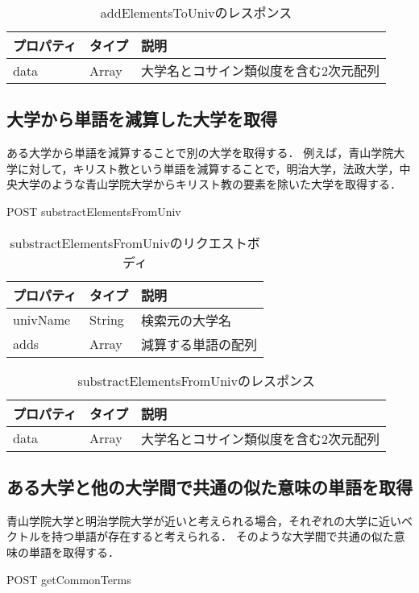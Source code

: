 \begin{table}[htbp]
\caption{addElementsToUnivのレスポンス}
\centering
\begin{tabular}{lll}
\hline
プロパティ & タイプ & 説明
\\ \hline \hline
data & Array & 大学名とコサイン類似度を含む2次元配列\\  \hline
\end{tabular}
\end{table}

\subsection{大学から単語を減算した大学を取得}
ある大学から単語を減算することで別の大学を取得する．
例えば，青山学院大学に対して，キリスト教という単語を減算することで，明治大学，法政大学，中央大学のような青山学院大学からキリスト教の要素を除いた大学を取得する．

POST substractElementsFromUniv

\begin{table}[htbp]
\caption{substractElementsFromUnivのリクエストボディ}
\centering
\begin{tabular}{lll}
\hline
プロパティ & タイプ & 説明
\\ \hline \hline
univName & String & 検索元の大学名\\
adds & Array & 減算する単語の配列\\  \hline
\end{tabular}
\end{table}

\begin{table}[htbp]
\caption{substractElementsFromUnivのレスポンス}
\centering
\begin{tabular}{lll}
\hline
プロパティ & タイプ & 説明
\\ \hline \hline
data & Array & 大学名とコサイン類似度を含む2次元配列\\  \hline
\end{tabular}
\end{table}

\subsection{ある大学と他の大学間で共通の似た意味の単語を取得}
青山学院大学と明治学院大学が近いと考えられる場合，それぞれの大学に近いベクトルを持つ単語が存在すると考えられる．
そのような大学間で共通の似た意味の単語を取得する．

POST getCommonTerms

